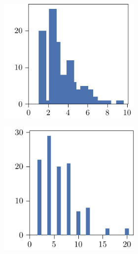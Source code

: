 \begin{figure}[p]
\begin{subfigure}{\textwidth}
\begin{subfigure}{\mymultiouter}
    \end{subfigure}
    \begin{subfigure}{\mymultiouter}
        \centering
          \includegraphics[width=\mymultiinner+4pt]{figures/new/eucledian-diabetes-permutation-retraining}
      \end{subfigure}
  \end{subfigure}
  \centering
  \begin{subfigure}{\textwidth}
    \centering
    \begin{subfigure}{\mymultiouter}
        \centering
          \includegraphics[width=\mymultiinner]{figures/new/manhattan-diabetes-qlibra-permutation}
    \end{subfigure}
    \begin{subfigure}{\mymultiouter}
        \centering

\end{subfigure}
\end{subfigure}
\end{figure}
